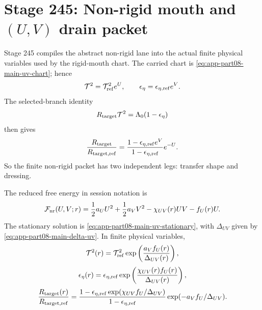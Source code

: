\section{Stage 245: Non-rigid mouth and \texorpdfstring{\((U,V)\)}{(U,V)} drain packet}
\label{sec:app-part08:non-rigid-mouth-and-u-v-drain-packet}
\label{stage:245}


Stage 245 compiles the abstract non-rigid lane into the actual finite physical variables used by the rigid-mouth chart.  The carried chart is \cref{eq:app-part08-main-uv-chart}; hence
\begin{equation}
\label{eq:app-part08-stage245-direct-observables}
\mathcal T^2=\mathcal T_{\rm ref}^{2}e^U,
\qquad
\epsilon_\eta=\epsilon_{\eta,{\rm ref}}e^V.
\end{equation}
The selected-branch identity
\begin{equation}
\label{eq:app-part08-stage245-selected-identity}
R_{\rm target}\mathcal T^2=\Lambda_0(1-\epsilon_\eta)
\end{equation}
then gives
\begin{equation}
\label{eq:app-part08-stage245-rtarget-finite}
\frac{R_{\rm target}}{R_{\rm target,ref}}
=
\frac{1-\epsilon_{\eta,{\rm ref}}e^V}{1-\epsilon_{\eta,{\rm ref}}}e^{-U}.
\end{equation}
So the finite non-rigid packet has two independent legs: transfer shape and dressing.

The reduced free energy in session notation is
\begin{equation}
\label{eq:app-part08-stage245-fnr}
\mathcal F_{\rm nr}(U,V;r)
=
\frac12a_UU^2+\frac12a_VV^2-\chi_{UV}(r)UV-f_U(r)U.
\end{equation}
The stationary solution is \cref{eq:app-part08-main-uv-stationary}, with \(\Delta_{UV}\) given by \cref{eq:app-part08-main-delta-uv}.  In finite physical variables,
\begin{equation}
\label{eq:app-part08-stage245-finite-t}
\mathcal T^2(r)
=
\mathcal T_{\rm ref}^2\exp\left(\frac{a_Vf_U(r)}{\Delta_{UV}(r)}\right),
\end{equation}
\begin{equation}
\label{eq:app-part08-stage245-finite-epseta}
\epsilon_\eta(r)
=
\epsilon_{\eta,{\rm ref}}\exp\left(\frac{\chi_{UV}(r)f_U(r)}{\Delta_{UV}(r)}\right),
\end{equation}
\begin{equation}
\label{eq:app-part08-stage245-finite-rtarget}
\frac{R_{\rm target}(r)}{R_{\rm target,ref}}
=
\frac{1-\epsilon_{\eta,{\rm ref}}\exp(\chi_{UV}f_U/\Delta_{UV})}{1-\epsilon_{\eta,{\rm ref}}}
\exp(-a_Vf_U/\Delta_{UV}).
\end{equation}

